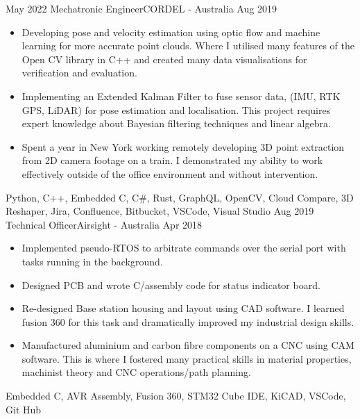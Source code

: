 %
%
%
\begin{experiences}
	\experience
		{May 2022}	{Mechatronic Engineer}{CORDEL - Australia}
		{Aug 2019}	{
			\begin{itemize}
				\item Developing pose and velocity estimation using optic flow and machine learning for more accurate point clouds. Where I utilised many features of the Open CV library in C++ and created many data visualisations for verification and evaluation.
				\item Implementing an Extended Kalman Filter to fuse sensor data, (IMU, RTK GPS, LiDAR) for pose estimation and localisation. This project requires expert knowledge about Bayesian filtering techniques and linear algebra.
				\item Spent a year in New York working remotely developing 3D point extraction from 2D camera footage on a train. I demonstrated my ability to work effectively outside of the office environment and without intervention.
			\end{itemize}
		}
		{Python, C++, Embedded C, C\#, Rust, GraphQL, OpenCV, Cloud Compare, 3D Reshaper, Jira, Confluence, Bitbucket, VSCode, Visual Studio}
	\emptySeparator
	\experience
		{Aug 2019}	{Technical Officer}{Airsight - Australia}
		{Apr 2018}	{
			\begin{itemize}
				\item Implemented pseudo-RTOS to arbitrate commands over the serial port with tasks running in the background.
				\item Designed PCB and wrote C/assembly code for status indicator board.
				\item Re-designed Base station housing and layout using CAD software. I learned fusion 360 for this task and dramatically improved my industrial design skills.
				\item Manufactured aluminium and carbon fibre components on a CNC using CAM software. This is where I fostered many practical skills in material properties, machinist theory and CNC operations/path planning.
			\end{itemize}
		}
		{Embedded C, AVR Assembly, Fusion 360, STM32 Cube IDE, KiCAD, VSCode, Git Hub}

\end{experiences}
